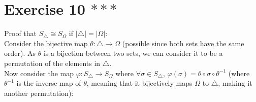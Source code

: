 \documentclass{article}
\begin{document}
    \section*{Exercise 10 $***$}
    Proof that $S_\triangle \cong S_\Omega$
    if $|\triangle| = |\Omega|$: \\
    Consider the bijective map $\theta: \triangle \to \Omega$
    (possible since both sets have the same order).
    As $\theta$ is a bijection between two sets,
    we can consider it to be a permutation of the elements in $\triangle$. \\
    Now consider the map $\varphi: S_\triangle \to S_\Omega$
    where $\forall \sigma \in S_\triangle$,
    $\varphi(\sigma) = \theta \circ \sigma \circ \theta^{-1}$
    (where $\theta^{-1}$ is the inverse map of $\theta$,
    meaning that it bijectively maps $\Omega$ to $\triangle$,
    making it another permutation): \\
\end{document}
